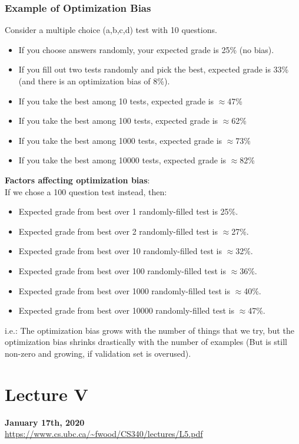 \documentclass{article}
\theoremstyle{definition}
\begin{document}
\subsubsection*{Example of Optimization Bias}
Consider a multiple choice (a,b,c,d) test with 10 questions.
\begin{itemize}
	\item If you {\color{OliveGreen} choose answers randomly}, your expected grade is 25\% (no bias).
	\item If you {\color{OliveGreen} fill out two tests randomly and pick the best}, expected grade is 33\% (and there is an optimization bias of 8\%).
	\item If you take {\color{OliveGreen} the best among 10 tests}, expected grade is $\approx$47\%
	\item If you take {\color{OliveGreen} the best among 100 tests}, expected grade is $\approx$62\%
	\item If you take {\color{OliveGreen} the best among 1000 tests}, expected grade is $\approx$73\%
	\item If you take {\color{OliveGreen} the best among 10000 tests}, expected grade is $\approx$82\%
\end{itemize}
\textbf{Factors affecting optimization bias}: \\
If we chose a {\color{OliveGreen} 100 question test} instead, then:
\begin{itemize}
	\item Expected grade from best over 1 randomly-filled test is 25\%.
	\item Expected grade from best over 2 randomly-filled test is $\approx$27\%.
	\item Expected grade from best over 10 randomly-filled test is $\approx$32\%.
	\item Expected grade from best over 100 randomly-filled test is $\approx$36\%.
	\item Expected grade from best over 1000 randomly-filled test is $\approx$40\%. 
	\item Expected grade from best over 10000 randomly-filled test is $\approx$47\%.
\end{itemize}
i.e.: The {\color{red} optimization bias grows with the number of things that we try}, but the {\color{blue} optimization bias shrinks drastically with the number of examples} (But is  {\color{red} still non-zero and growing}, if validation set is overused).

\newpage
\section*{Lecture V}
\textbf{January 17th, 2020}\\
\noindent \url{https://www.cs.ubc.ca/~fwood/CS340/lectures/L5.pdf}
\end{document}
